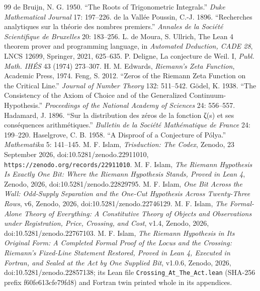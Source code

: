 \documentclass[10pt,twocolumn]{article}
\begin{document}
\begin{thebibliography}{99}
 de Bruijn, N. G. 1950. ``The Roots of Trigonometric Integrals.'' \emph{Duke Mathematical Journal} 17: 197--226.
 de la Vallée Poussin, C.-J. 1896. ``Recherches analytiques sur la théorie des nombres premiers.'' \emph{Annales de la Société Scientifique de Bruxelles} 20: 183--256.
 L. de Moura, S. Ullrich, The Lean 4 theorem prover and programming language, in \emph{Automated Deduction, CADE 28}, LNCS 12699, Springer, 2021, 625--635.
 P. Deligne, La conjecture de Weil. I, \emph{Publ. Math. IH\'ES} 43 (1974) 273--307.
 H. M. Edwards, \emph{Riemann's Zeta Function}, Academic Press, 1974.
 Feng, S. 2012. ``Zeros of the Riemann Zeta Function on the Critical Line.'' \emph{Journal of Number Theory} 132: 511--542.
 Gödel, K. 1938. ``The Consistency of the Axiom of Choice and of the Generalized Continuum-Hypothesis.'' \emph{Proceedings of the National Academy of Sciences} 24: 556--557.
 Hadamard, J. 1896. ``Sur la distribution des zéros de la fonction ζ(s) et ses conséquences arithmétiques.'' \emph{Bulletin de la Société Mathématique de France} 24: 199--220.
 Haselgrove, C. B. 1958. ``A Disproof of a Conjecture of Pólya.'' \emph{Mathematika} 5: 141--145.
 M. F. Islam, \emph{Trisduction: The Codex}, Zenodo, 23 September 2026, doi:10.5281/zenodo.22911010, \texttt{https://zenodo.org/records/22911010}.
 M. F. Islam, \emph{The Riemann Hypothesis Is Exactly One Bit: Where the Riemann Hypothesis Stands, Proved in Lean 4}, Zenodo, 2026, doi:10.5281/zenodo.22829795.
 M. F. Islam, \emph{One Bit Across the Wall: Odd-Supply Separation and the One-Cut Hypothesis Across Twenty-Three Rows}, v6, Zenodo, 2026, doi:10.5281/zenodo.22746129.
 M. F. Islam, \emph{The Formal-Alone Theory of Everything: A Constitutive Theory of Objects and Observations under Registration, Price, Crossing, and Cost}, v1.4, Zenodo, 2026, doi:10.5281/zenodo.22767103.
 M. F. Islam, \emph{The Riemann Hypothesis in Its Original Form: A Completed Formal Proof of the Locus and the Crossing: Riemann's Fixed-Line Statement Restored, Proved in Lean 4, Executed in Fortran, and Sealed at the Act by One Supplied Bit}, v1.0.6, Zenodo, 2026, doi:10.5281/zenodo.22857138; its Lean file \texttt{Crossing\_\allowbreak At\_\allowbreak The\_\allowbreak Act.lean} (SHA-256 prefix f60fe613cfe79fd8) and Fortran twin printed whole in its appendices.

\end{thebibliography}
\end{document}
